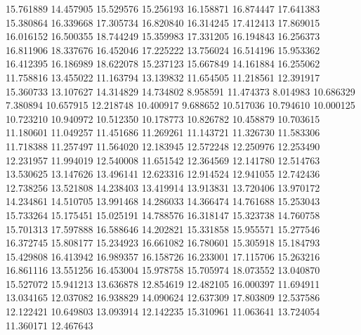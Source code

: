 15.761889
14.457905
15.529576
15.256193
16.158871
16.874447
17.641383
15.380864
16.339668
17.305734
16.820840
16.314245
17.412413
17.869015
16.016152
16.500355
18.744249
15.359983
17.331205
16.194843
16.256373
16.811906
18.337676
16.452046
17.225222
13.756024
16.514196
15.953362
16.412395
16.186989
18.622078
15.237123
15.667849
14.161884
16.255062
11.758816
13.455022
11.163794
13.139832
11.654505
11.218561
12.391917
15.360733
13.107627
14.314829
14.734802
8.958591
11.474373
8.014983
10.686329
7.380894
10.657915
12.218748
10.400917
9.688652
10.517036
10.794610
10.000125
10.723210
10.940972
10.512350
10.178773
10.826782
10.458879
10.703615
11.180601
11.049257
11.451686
11.269261
11.143721
11.326730
11.583306
11.718388
11.257497
11.564020
12.183945
12.572248
12.250976
12.253490
12.231957
11.994019
12.540008
11.651542
12.364569
12.141780
12.514763
13.530625
13.147626
13.496141
12.623316
12.914524
12.941055
12.742436
12.738256
13.521808
14.238403
13.419914
13.913831
13.720406
13.970172
14.234861
14.510705
13.991468
14.286033
14.366474
14.761688
15.253043
15.733264
15.175451
15.025191
14.788576
16.318147
15.323738
14.760758
15.701313
17.597888
16.588646
14.202821
15.331858
15.955571
15.277546
16.372745
15.808177
15.234923
16.661082
16.780601
15.305918
15.184793
15.429808
16.413942
16.989357
16.158726
16.233001
17.115706
15.263216
16.861116
13.551256
16.453004
15.978758
15.705974
18.073552
13.040870
15.527072
15.941213
13.636878
12.854619
12.482105
16.000397
11.694911
13.034165
12.037082
16.938829
14.090624
12.637309
17.803809
12.537586
12.122421
10.649803
13.093914
12.142235
15.310961
11.063641
13.724054
11.360171
12.467643
